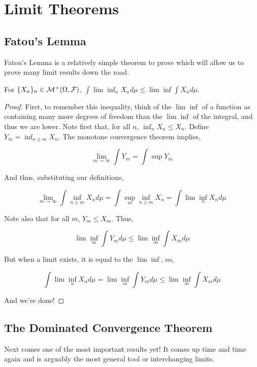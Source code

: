     \section{Limit Theorems}

    \subsection{Fatou's Lemma}

    Fatou's Lemma is a relatively simple theorem to prove which will allow us 
    to prove many limit results down the road. 

    \begin{lemma}
        For $\{X_n\}_n \in \mathcal M^+(\Omega, \mathcal F)$, $\int \lim\inf_n X_n d\mu \leq \lim\inf \int X_n d\mu$. 
    \end{lemma}

    \begin{proof}
        First, to remember this inequality, think of the $\lim\inf$ of a function 
        as containing many more degrees of freedom than the $\lim\inf$ of the integral, 
        and thus we are lower. Note first that, for all $n$, $\inf_n X_n \leq X_n$. 
        Define $Y_m = \inf_{n \geq m} X_n$. The monotone convergence theorem implies, 

        \[ \lim_{m \to \infty} \int Y_m = \int \sup Y_m \]

        And thus, substituting our definitions, 

        \[  \lim_{m \to \infty}  \int \inf_{n \geq m} X_n d\mu = \int \sup_m \inf_{n \geq m} X_n  = \int \lim\inf_n X_n d\mu \]

        Note also that for all $m$, $Y_m \leq X_m$. Thus, 

        \[  \lim\inf_m \int Y_m d\mu \leq \lim\inf_m \int X_m d\mu \]

        But when a limit exists, it is equal to the $\lim\inf$, so,

        \[\int \lim\inf_n X_n d\mu  =  \lim\inf_m \int Y_m d\mu \leq \lim\inf_m \int X_m d\mu \]

        And we're done!

    \end{proof}


    \subsection{The Dominated Convergence Theorem}

    Next comes one of the most important results yet! It comes up time and time again and is 
    arguably the most general tool or interchanging limits. 

